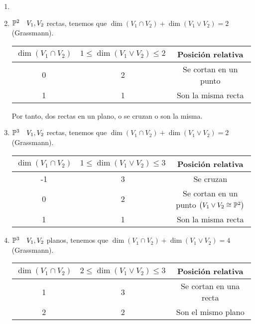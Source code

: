 \begin{example}
    \begin{enumerate}
        \item[]
        \item $\mathbb{P}^2 \quad V_1, V_2$ rectas, tenemos que $\dim \left( V_1 \cap V_2 \right) + \dim \left( V_1 \vee V_2 \right) = 2$ (Grassmann).
        \begin{center} \begin{tabular}{|c|c|c|}
            \hline $\dim \left( V_1 \cap V_2 \right)$ & $1 \leq \dim \left( V_1 \vee V_2 \right) \leq 2$  & Posición relativa \\
            \hline \hline
            0 & 2 & Se cortan en un punto \\ \hline
            1 & 1 & Son la misma recta\\ \hline
        \end{tabular} \end{center}
        Por tanto, dos rectas en un plano, o se cruzan o son la misma.
        \item $\mathbb{P}^3 \quad V_1, V_2$ rectas, tenemos que $\dim \left( V_1 \cap V_2 \right) + \dim \left( V_1 \vee V_2 \right) = 2$ (Grassmann).
        \begin{center} \begin{tabular}{|c|c|c|}
            \hline $\dim \left( V_1 \cap V_2 \right)$ & $1 \leq \dim \left( V_1 \vee V_2 \right) \leq 3$  & Posición relativa \\
            \hline \hline
            -1 & 3 & Se cruzan \\ \hline
            0 & 2 & Se cortan en un punto $\left( V_1 \vee V_2 \cong \mathbb{P}^2 \right)$ \\ \hline
            1 & 1 & Son la misma recta\\ \hline
        \end{tabular} \end{center}
        \item $\mathbb{P}^3 \quad V_1, V_2$ planos, tenemos que $\dim \left( V_1 \cap V_2 \right) + \dim \left( V_1 \vee V_2 \right) = 4$ (Grassmann).
        \begin{center} \begin{tabular}{|c|c|c|}
            \hline $\dim \left( V_1 \cap V_2 \right)$ & $2 \leq \dim \left( V_1 \vee V_2 \right) \leq 3$  & Posición relativa \\
            \hline \hline
            1 & 3 & Se cortan en una recta \\ \hline
            2 & 2 & Son el mismo plano\\ \hline

\end{tabular}
\end{center}
\end{enumerate}
\end{example}
